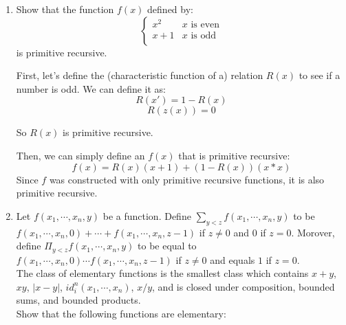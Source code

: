 
\usepackage{amsmath, dsfont, mathtools, verbatim, tikz, float, textcomp, mathrsfs}

\usetikzlibrary{arrows,automata}

\oddsidemargin 0in
\evensidemargin 0in
\textwidth 6.5in
\topmargin -0.5in
\textheight 9.0in
\newcommand{\norm}[1]{\left\lVert #1 \right\rVert}
\newcommand{\abs}[1]{\left\vert #1 \right\vert}
\newcommand{\?}{\stackrel{?}{=}}
\DeclarePairedDelimiter{\ceil}{\lceil}{\rceil}






\pagestyle{myheadings}

\begin{enumerate}
  \item 
    \begin{question}
      Show that the function $f(x)$ defined by:
      \[ \begin{cases} 
        x^2 & x \text{  is even}\\
        x+1 & x \text{  is odd}\\
      \end{cases}
      \]
      is primitive recursive.
    \end{question}

    First, let's define the (characteristic function of a) relation $R(x)$ to see if a number is odd. We can define it as:
    $$R(x') = 1 - R(x)$$
    $$R(z(x)) = 0$$

    So $R(x)$ is primitive recursive.

    Then, we can simply define an $f(x)$ that is primitive recursive:
    $$f(x) = R(x)(x+1) + (1 - R(x))(x*x)$$
    Since $f$ was constructed with only primitive recursive functions, it is also primitive recursive.
  \item
    \begin{question}
      Let $f(x_1,\cdots,x_n,y)$ be a function. Define $\sum_{y < z} f(x_1,\cdots,x_n,y)$ to be $f(x_1,\cdots,x_n,0) + \cdots + f(x_1,\cdots,x_n,z-1)$ if $z \neq 0$ and $0$ if $z=0$. Morover, define $\Pi_{y<z} f(x_1,\cdots,x_n,y)$ to be equal to $f(x_1,\cdots,x_n,0) \cdots f(x_1,\cdots,x_n,z-1)$ if $z \neq 0$ and equals $1$ if $z=0$.\\
      The class of elementary functions is the smallest class which contains $x+y$, $xy$, $\abs{x-y}$, $id^{n}_{i}(x_1,\cdots,x_n)$, $x/y$, and is closed under composition, bounded sums, and bounded products.\\
      Show that the following functions are elementary:
    \end{question}


\end{enumerate}
